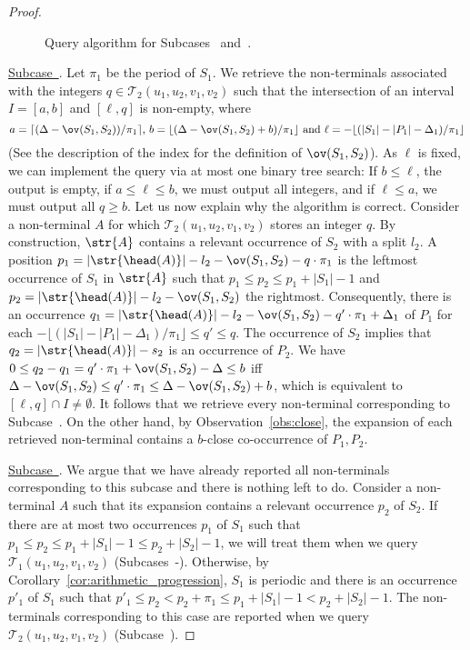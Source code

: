 \begin{proof}
\begin{figure}[h!]
\caption{Query algorithm for Subcases~ and~.}
\label{fig:included}
\end{figure}

{\underline{Subcase~}}. Let $\pi_1$ be the period of $S_1$. We retrieve the non-terminals associated with the integers $q \in \mathcal{T}_2(u_1, u_2,v_1, v_2)$ such that the intersection of an interval $I = [a,b]$ and $[\ell,q]$ is non-empty, where 
$$a=\lceil{(\Delta-\ov(S_1,S_2))/\pi_1\rceil} \text{, } b=\lfloor{(\Delta-\ov(S_1,S_2)+b)/ \pi_1 \rfloor} \text{ and } \ell = -\lfloor{(|S_1|-|P_1|-\Delta_1)/\pi_1\rfloor}$$
(See the description of the index for the definition of $\ov(S_1,S_2)$). As $\ell$ is fixed, we can implement the query via at most one binary tree search: If $b \le \ell$, the output is empty, if $a \le \ell \le b$, we must output all integers, and if $\ell \le a$, we must output all $q \ge b$. Let us now explain why the algorithm is correct. Consider a non-terminal $A$ for which $\mathcal{T}_2(u_1, u_2,v_1, v_2)$ stores an integer $q$. By construction, $\str{A}$ contains a relevant occurrence of $S_2$ with a split $l_2$. A position $p_1 = |\str{\head(A)}|-l_2-\ov(S_1,S_2)-q \cdot \pi_1$ is the leftmost occurrence of $S_1$ in $\str{A}$ such that $p_1 \le p_2 \le p_1+|S_1|-1$ and $p_2 = |\str{\head(A)}|-l_2-\ov(S_1,S_2)$ the rightmost. Consequently, there is an occurrence $q_1 = |\str{\head(A)}|-l_2-\ov(S_1,S_2)-q'\cdot \pi_1+\Delta_1$ of $P_1$ for each $-\lfloor{(|S_1|-|P_1|-\Delta_1)/\pi_1\rfloor} \le q' \le q$. The occurrence of $S_2$ implies that $q_2 = |\str{\head(A)}|-s_2$ is an occurrence of $P_2$. We have $0 \le q_2-q_1=q'\cdot\pi_1+\ov(S_1,S_2)-\Delta\le b$ iff $\Delta-\ov(S_1,S_2) \le  q' \cdot \pi_1 \le \Delta-\ov(S_1,S_2)+b$, which is equivalent to $[\ell,q] \cap I \neq \emptyset$. It follows that we retrieve every non-terminal corresponding to Subcase~. On the other hand, by Observation~\ref{obs:close}, the expansion of each retrieved non-terminal contains a $b$-close co-occurrence of $P_1, P_2$.

{\underline{Subcase~}}. We argue that we have already reported all non-terminals corresponding to this subcase and there is nothing left to do. Consider a non-terminal $A$ such that its expansion contains a relevant occurrence $p_2$ of $S_2$. If there are at most two occurrences $p_1$ of $S_1$ such that $p_1 \le p_2 \le p_1+|S_1|-1\le p_2+|S_2|-1$, we will treat them when we query $\mathcal{T}_1(u_1, u_2,v_1, v_2)$ (Subcases~-). Otherwise, by Corollary~\ref{cor:arithmetic_progression}, $S_1$ is periodic and there is an occurrence $p'_1$ of $S_1$ such that $p'_1 \le p_2 < p_2 + \pi_1 \le p_1+|S_1|-1 < p_2 + |S_2|-1$. The non-terminals corresponding to this case are reported when we query $\mathcal{T}_2(u_1, u_2,v_1, v_2)$ (Subcase~).



\end{proof}
